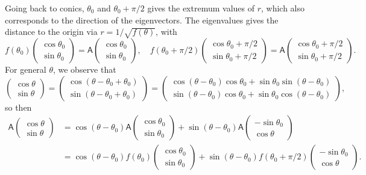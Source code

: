 \documentclass[10pt,notitlepage]{revtex4-1}
\begin{document}
Going back to conics, $\theta_0$ and $\theta_0+\pi/2$ gives the extremum values
of $r$, which also corresponds to the direction of the eigenvectors. The
eigenvalues gives the distance to the origin via $r=1/\sqrt{f(\theta)}$, with
\begin{equation}
	f(\theta_0)\begin{pmatrix}\cos\theta_0 \\ \sin\theta_0\end{pmatrix}
	=\mathsf{A}\begin{pmatrix}\cos\theta_0 \\ \sin\theta_0\end{pmatrix},\quad
	f(\theta_0+\pi/2)
	\begin{pmatrix}\cos\theta_0+\pi/2 \\ \sin\theta_0+\pi/2\end{pmatrix}
	=\mathsf{A}
	\begin{pmatrix}\cos\theta_0+\pi/2 \\ \sin\theta_0+\pi/2\end{pmatrix}.
\end{equation}
For general $\theta$, we observe that
\begin{equation}
	\begin{pmatrix}\cos\theta \\ \sin\theta\end{pmatrix}=
	\begin{pmatrix}\cos(\theta-\theta_0+\theta_0)
	 \\ \sin(\theta-\theta_0+\theta_0)\end{pmatrix}=
	 \begin{pmatrix}\cos(\theta-\theta_0)\cos\theta_0
	 +\sin\theta_0 \sin(\theta-\theta_0)
	 \\ \sin(\theta-\theta_0)\cos\theta_0 + \sin\theta_0 \cos(\theta-\theta_0)
	 \end{pmatrix},
\end{equation}
so then
\begin{equation}\begin{aligned}
	\mathsf{A}\begin{pmatrix}\cos\theta \\ \sin\theta\end{pmatrix}
	&=\cos(\theta-\theta_0)\mathsf{A}
	\begin{pmatrix}\cos\theta_0 \\ \sin\theta_0\end{pmatrix}
	+\sin(\theta-\theta_0)\mathsf{A}
	\begin{pmatrix}-\sin\theta_0 \\ \cos\theta\end{pmatrix}\\
	&=\cos(\theta-\theta_0)f(\theta_0)
	\begin{pmatrix}\cos\theta_0 \\ \sin\theta_0\end{pmatrix}
	+\sin(\theta-\theta_0)f(\theta_0+\pi/2)
	\begin{pmatrix}-\sin\theta_0 \\ \cos\theta\end{pmatrix}.
\end{aligned}\end{equation}
\end{document}
